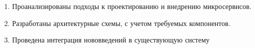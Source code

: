 \begin{enumerate}
  \item Проанализированы подходы к проектированию и внедрению микросервисов.
  \item Разработаны архитектурные схемы, с учетом требуемых компонентов.
  \item Проведена интеграция нововведений в существующую систему
\end{enumerate}
